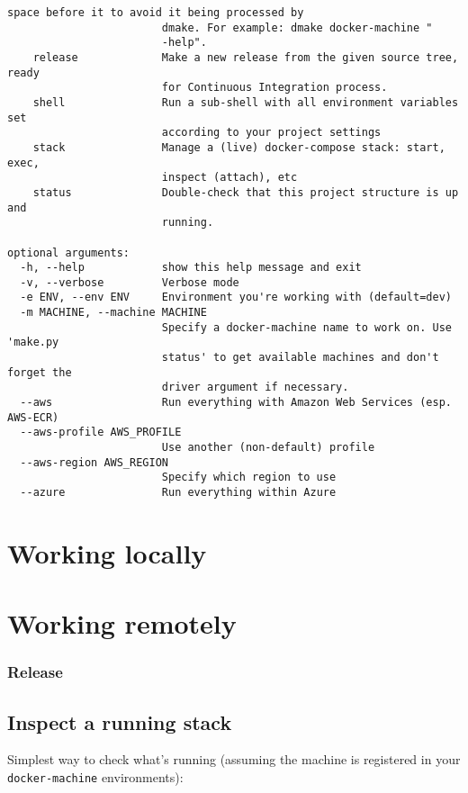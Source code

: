 \begin{lstlisting}[style=console,caption={Dmake basic usage}]
                        space before it to avoid it being processed by
                        dmake. For example: dmake docker-machine "
                        -help".
    release             Make a new release from the given source tree, ready
                        for Continuous Integration process.
    shell               Run a sub-shell with all environment variables set
                        according to your project settings
    stack               Manage a (live) docker-compose stack: start, exec,
                        inspect (attach), etc
    status              Double-check that this project structure is up and
                        running.

optional arguments:
  -h, --help            show this help message and exit
  -v, --verbose         Verbose mode
  -e ENV, --env ENV     Environment you're working with (default=dev)
  -m MACHINE, --machine MACHINE
                        Specify a docker-machine name to work on. Use 'make.py
                        status' to get available machines and don't forget the
                        driver argument if necessary.
  --aws                 Run everything with Amazon Web Services (esp. AWS-ECR)
  --aws-profile AWS_PROFILE
                        Use another (non-default) profile
  --aws-region AWS_REGION
                        Specify which region to use
  --azure               Run everything within Azure

\end{lstlisting}

\section{Working locally}


\section{Working remotely}

\subsubsection{Release}

\subsection{Inspect a running stack}

Simplest way to check what's running (assuming the machine is registered in your \texttt{docker-machine}
environments):

